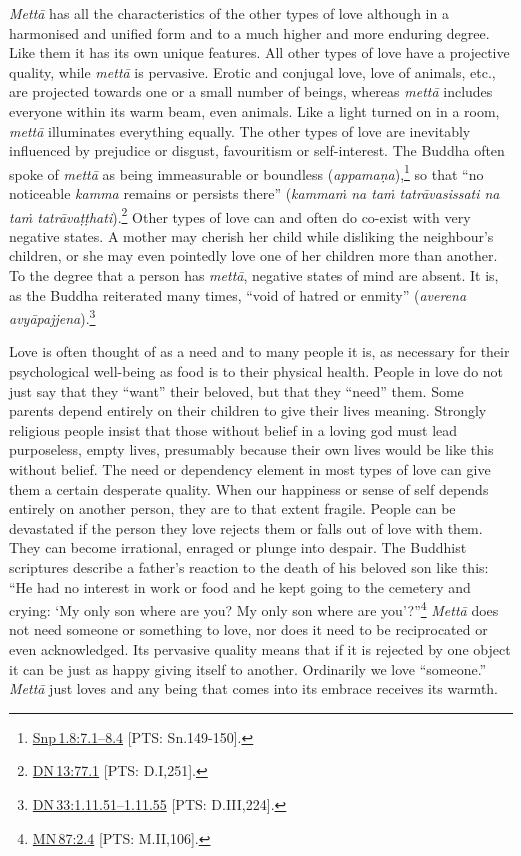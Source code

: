 \documentclass[10pt, openright]{book}
\begin{document}
\textit{Mettā} has all the characteristics of the other types of love although in a harmonised and unified form and to a much higher and more enduring degree. Like them it has its own unique features. All other types of love have a projective quality, while \textit{mettā} is pervasive. Erotic and conjugal love, love of animals, etc., are projected towards one or a small number of beings, whereas \textit{mettā} includes everyone within its warm beam, even animals. Like a light turned on in a room, \textit{mettā} illuminates everything equally. The other types of love are inevitably influenced by prejudice or disgust, favouritism or self-interest. The Buddha often spoke of \textit{mettā} as being immeasurable or boundless (\textit{appamaṇa}),\footnote {\href{https://suttacentral.net/snp1.8/en/sujato\#7.1}{Snp 1.8:7.1–8.4} [PTS: Sn.149-150].} so that “no noticeable \textit{kamma} remains or persists there” (\textit{kammaṁ na taṁ tatrāvasissati na taṁ tatrāvaṭṭhati}).\footnote {\href{https://suttacentral.net/dn13/en/sujato\#77.1}{DN 13:77.1} [PTS: D.I,251].} Other types of love can and often do co-exist with very negative states. A mother may cherish her child while disliking the neighbour’s children, or she may even pointedly love one of her children more than another. To the degree that a person has \textit{mettā}, negative states of mind are absent. It is, as the Buddha reiterated many times, “void of hatred or enmity” (\textit{averena avyāpajjena}).\footnote {\href{https://suttacentral.net/dn33/en/sujato\#1.11.51}{DN 33:1.11.51–1.11.55} [PTS: D.III,224].}


Love is often thought of as a need and to many people it is, as necessary for their psychological well-being as food is to their physical health. People in love do not just say that they “want” their beloved, but that they “need” them. Some parents depend entirely on their children to give their lives meaning. Strongly religious people insist that those without belief in a loving god must lead purposeless, empty lives, presumably because their own lives would be like this without belief. The need or dependency element in most types of love can give them a certain desperate quality. When our happiness or sense of self depends entirely on another person, they are to that extent fragile. People can be devastated if the person they love rejects them or falls out of love with them. They can become irrational, enraged or plunge into despair. The Buddhist scriptures describe a father’s reaction to the death of his beloved son like this: “He had no interest in work or food and he kept going to the cemetery and crying: ‘My only son where are you? My only son where are you’?”\footnote {\href{https://suttacentral.net/mn87/en/sujato\#2.4}{MN 87:2.4} [PTS: M.II,106].} \textit{Mettā} does not need someone or something to love, nor does it need to be reciprocated or even acknowledged. Its pervasive quality means that if it is rejected by one object it can be just as happy giving itself to another. Ordinarily we love “someone.” \textit{Mettā} just loves and any being that comes into its embrace receives its warmth.
\end{document}
